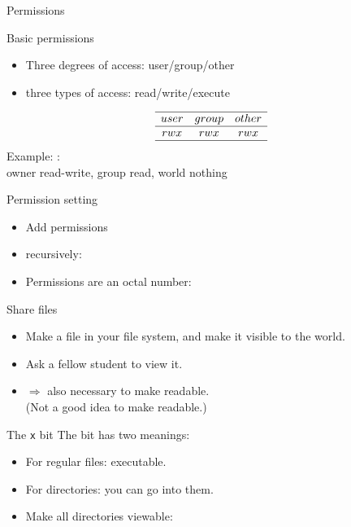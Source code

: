 \documentclass[11pt,headernav]{beamer}
\begin{document}
 {Permissions}

\begin{numberedframe}{Basic permissions}
  \label{sl-lnx:rwx}
  \begin{itemize}
  \item Three degrees of access: user/group/other
  \item three types of access: read/write/execute
  \end{itemize}
  \[ \begin{array}{ccc}
    \hline user&group&other\\ \hline rwx&rwx&rwx \\ \hline
  \end{array}
  \]
  Example: :\\
  owner read-write, group read, world nothing
\end{numberedframe}

\begin{numberedframe}{Permission setting}
  \label{sl-lnx:755}
  \begin{itemize}
  \item Add permissions 
  \item recursively: 
  \item Permissions are an octal number:
  \end{itemize}
\end{numberedframe}


\begin{numberedframe}{Share files}
  \label{sl-lnx:share}
  \begin{itemize}
  \item Make a file in your  file system,
    and make it visible to the world.
  \item Ask a fellow student to view it.
  \item $\Rightarrow$ also necessary to make  readable.\\
    (Not a good idea to make  readable.)
  \end{itemize}
\end{numberedframe}

\begin{numberedframe}{The \texttt{x} bit}
  \label{sl-lnx:x}
  The  bit has two meanings:
  \begin{itemize}
  \item For regular files: executable.
  \item For directories: you can go into them.
  \item Make all directories viewable:\\
  \end{itemize}
\end{numberedframe}
\end{document}

